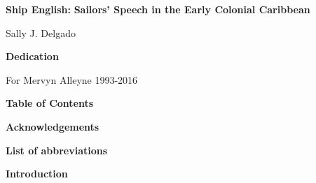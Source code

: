
\clearpage\setcounter{page}{1}\begin{styleStandard}
\textbf{Ship English: }\textbf{Sailors’ Speech in the Early Colonial Caribbean}
\end{styleStandard}

\begin{styleStandard}
Sally J. Delgado
\end{styleStandard}

\clearpage\begin{styleStandard}
\textbf{Dedication}
\end{styleStandard}

\begin{styleStandard}
For Mervyn Alleyne 1993-2016
\end{styleStandard}

\clearpage\begin{styleNormali}
\textbf{Table of Contents}
\end{styleNormali}

\begin{styleNormali}
\textbf{Acknowledgements }
\end{styleNormali}

\begin{styleNormali}
\textbf{List of abbreviations }
\end{styleNormali}


\setcounter{listWWNumiileveli}{0}
\begin{listWWNumiileveli}
\item 
\begin{styleNormali}
\textbf{Introduction }
\end{styleNormali}
\end{listWWNumiileveli}

